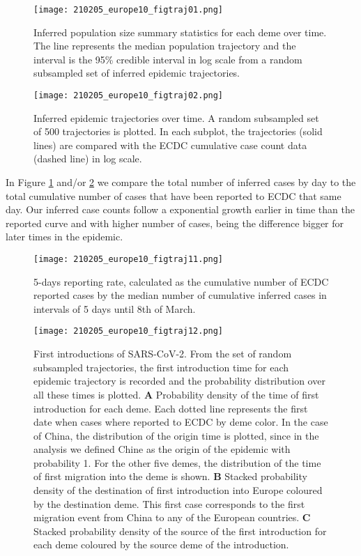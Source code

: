 \begin{figure}[ht]
    \centering
    \texttt{[image: 210205\_europe10\_figtraj01.png]}
    \caption{Inferred population size summary statistics for each deme over time. The line represents the median population trajectory and the interval is the 95\%  credible interval in log scale from a random subsampled set of inferred epidemic trajectories.}
    \label{fig:gribbon}
\end{figure}


\begin{figure}[p]
    \centering
    \texttt{[image: 210205\_europe10\_figtraj02.png]}
    \caption{Inferred epidemic trajectories over time. A random subsampled set of 500 trajectories is plotted. In each subplot, the trajectories (solid lines) are compared with the ECDC cumulative case count data (dashed line) in log scale.}
    \label{fig:trajs}
\end{figure}


In Figure \ref{fig:gribbon} and/or \ref{fig:trajs} we compare the total number of inferred cases by day to the total cumulative number of cases that have been reported to ECDC that same day. Our inferred case counts follow a exponential growth earlier in time than the reported curve and with higher number of cases, being the difference bigger for later times in the epidemic.\\


\begin{figure}[ht]
    \centering
    \texttt{[image: 210205\_europe10\_figtraj11.png]}
    \caption{5-days reporting rate, calculated as the cumulative number of ECDC reported cases by the median number of cumulative inferred cases in intervals of 5 days until 8th of March. }
    \label{fig:reported}
\end{figure}


\begin{figure}[p]
    \centering
    \texttt{[image: 210205\_europe10\_figtraj12.png]}
    \caption{First introductions of SARS-CoV-2. From the set of random subsampled trajectories, the first introduction time for each epidemic trajectory is recorded and the probability distribution over all these times is plotted. \textbf{A} Probability density of the time of first introduction for each deme. Each dotted line represents the first date when cases where reported to ECDC by deme color. In the case of China, the distribution of the origin time is plotted, since in the analysis we defined Chine as the origin of the epidemic with probability 1. For the other five demes, the distribution of the time of first migration into the deme is shown. \textbf{B} Stacked probability density of the destination of first introduction into Europe coloured by the destination deme. This first case corresponds to the first migration event from China to any of the European countries. \textbf{C} Stacked probability density of the source of the first introduction for each deme coloured by the source deme of the introduction.}
    \label{fig:first}
\end{figure}


